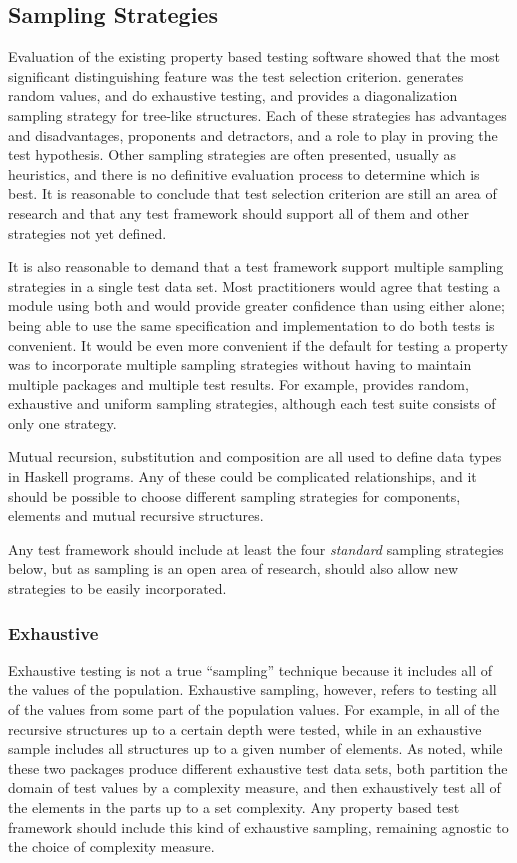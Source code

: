 \subsection{Sampling Strategies}

Evaluation of the existing property based testing software showed that 
the most significant distinguishing feature was the test selection criterion.
\QC generates random values, \SC and \GAST do exhaustive testing,
and \EC provides a diagonalization sampling strategy for tree-like structures.
Each of these strategies has advantages and disadvantages,
proponents and detractors, and a role to play in proving the test hypothesis.
Other sampling strategies are often presented, usually as heuristics,
and there is no definitive evaluation process to determine which is best.
It is reasonable to conclude that test selection criterion are still
an area of research and that any test framework should support
all of them and other strategies not yet defined.

It is also reasonable to demand that a test framework support
multiple sampling strategies in a single test data set.
Most practitioners would agree that testing a module
using both \QC and \SC would provide greater confidence
than using either alone; being able to use the same specification
and implementation to do both tests is convenient.
It would be even more convenient if the default for testing a property
was to incorporate multiple sampling strategies without
having to maintain multiple packages and multiple test results.
For example, \FEAT provides random, exhaustive and uniform sampling strategies,
although each test suite consists of only one strategy.

Mutual recursion, substitution and composition are all used
to define data types in Haskell programs.
Any of these could be complicated relationships,
and it should be possible to choose different sampling strategies
for components, elements and mutual recursive structures.

Any test framework  should include at least 
the four \emph{standard} sampling strategies below,
but as sampling is an open area of research, 
should also allow new strategies to be easily incorporated.

\subsubsection{Exhaustive}

Exhaustive testing is not a true ``sampling'' technique because 
it includes all of the values of the population.
Exhaustive sampling, however, refers to testing all of the values
from some part of the population values.
For example, in \SC all of the recursive structures up to a certain depth were tested,
while in \FEAT an exhaustive sample includes all structures up to a given number of elements.
As noted, while these two packages produce different exhaustive test data sets,
both partition the domain of test values by a complexity measure,
and then exhaustively test all of the elements in the parts up to a set complexity.
Any property based test framework should include this kind of exhaustive sampling,
remaining agnostic to the choice of complexity measure.

